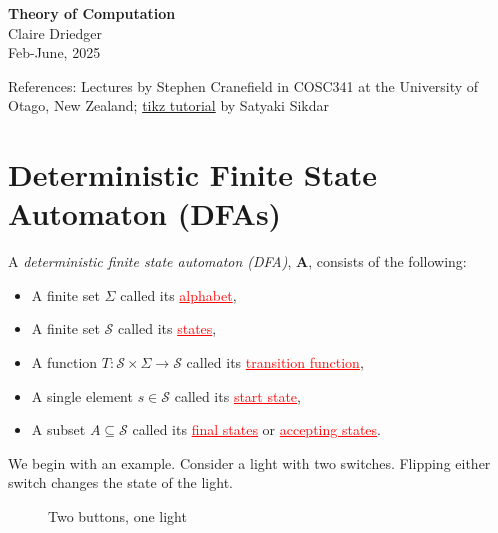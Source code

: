 \documentclass[11pt]{article}
\newcommand{\defn}[0]{\tcbhighmath[boxrule=0.5mm, colframe=cyan!20, colback=cyan!20, arc=10mm, size=fbox]{\textbf{DEF:}}}
\begin{document}
\begin{center}
    {\LARGE \textbf{Theory of Computation}} \\[0.5em]
    {\large Claire Driedger} \\[0.3em]
    {\normalsize Feb-June, 2025}
\end{center}
\noindent
\colorbox{gray!20}{%
  \parbox{\textwidth}{%
    References: Lectures by Stephen Cranefield in COSC341 at the University of Otago, New Zealand; \href{https://www3.nd.edu/~kogge/courses/cse30151-fa17/Public/other/tikz_tutorial.pdf}{tikz tutorial} by Satyaki Sikdar
  }
}

\tableofcontents
\newpage

\section{Deterministic Finite State Automaton (DFAs)}

\defn A \textit{deterministic finite state automaton (DFA)}, \textbf{A}, consists of the following:
\begin{itemize}[itemsep=-2pt]
    \item A finite set $\Sigma$ called its \textcolor{red}{\underline{alphabet}},
    \item A finite set $\mathcal{S}$ called its \textcolor{red}{\underline{states}},
    \item A function $T :\mathcal{S} \times \Sigma \to \mathcal{S}$ called its \textcolor{red}{\underline{transition function}},
    \item A single element $s \in \mathcal{S}$ called its \textcolor{red}{\underline{start state}},
    \item A subset $A \subseteq \mathcal{S}$ called its \textcolor{red}{\underline{final states}} or \textcolor{red}{\underline{accepting states}}.
\end{itemize}

We begin with an example. Consider a light with two switches. Flipping either switch changes the state of the light.


\begin{figure}[ht] %
\centering %
\caption{Two buttons, one light}
\label{fig:2b1l}
\end{figure}
\end{document}
